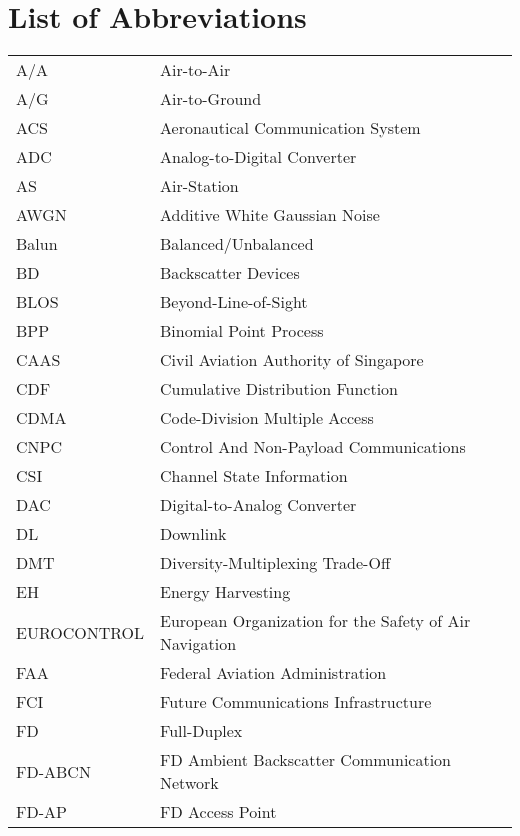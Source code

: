 \chapter* {List of Abbreviations}

\begin{longtable}{ll}
A/A 	&	Air-to-Air																			\\
A/G		& Air-to-Ground																		\\
ACS		& Aeronautical Communication System								\\
ADC		& Analog-to-Digital Converter											\\
AS		& Air-Station																			\\
AWGN	&	Additive White Gaussian Noise										\\
Balun	& Balanced/Unbalanced															\\
BD		& Backscatter Devices															\\
BLOS	&	Beyond-Line-of-Sight 														\\
BPP		&	 Binomial Point Process													\\
CAAS	&	Civil Aviation Authority of Singapore						\\
CDF		&	Cumulative Distribution Function								\\
CDMA	&	Code-Division Multiple Access										\\
CNPC	&	Control And Non-Payload Communications					\\
CSI		&	Channel State Information												\\
DAC		&	Digital-to-Analog Converter											\\
DL		& Downlink																				\\
DMT		&	Diversity-Multiplexing Trade-Off								\\
EH		&	Energy Harvesting																\\
EUROCONTROL	&	European Organization for the Safety of Air Navigation \\
FAA		& Federal Aviation Administration									\\
FCI		& Future Communications Infrastructure						\\
FD		&	Full-Duplex																			\\
FD-ABCN &	FD Ambient Backscatter Communication Network	\\
FD-AP	&	FD Access Point																	\\

\end{longtable}
